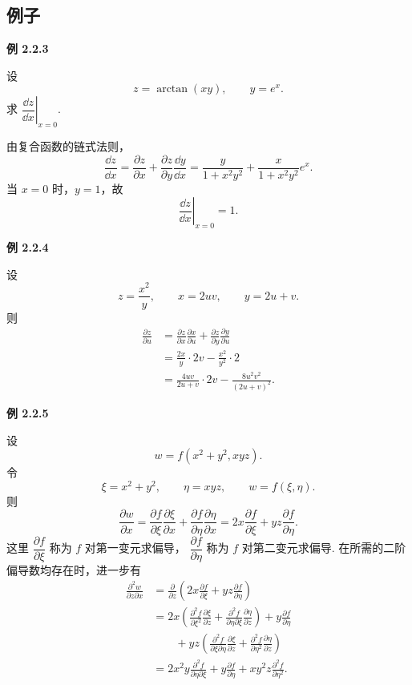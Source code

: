 \subsection*{例子}



\textbf{例 2.2.3}

设
	\[
	z=\arctan(xy),\qquad y=e^x.
	\]
	求 $\left.\dfrac{\dd z}{\dd x}\right|_{x=0}$.

	由复合函数的链式法则，
	\[
	\frac{\dd z}{\dd x}
	=
	\frac{\partial z}{\partial x}
	+
	\frac{\partial z}{\partial y}\frac{\dd y}{\dd x}
	=
	\frac{y}{1+x^2y^2}
	+
	\frac{x}{1+x^2y^2}e^x.
	\]
	当 $x=0$ 时，$y=1$，故
	\[
	\left.\frac{\dd z}{\dd x}\right|_{x=0}=1.
	\]






\textbf{例 2.2.4}

设
	\[
	z=\frac{x^2}{y},\qquad x=2uv,\qquad y=2u+v.
	\]
	则
	\[
	\begin{aligned}
	\frac{\partial z}{\partial u}
	&=
	\frac{\partial z}{\partial x}\frac{\partial x}{\partial u}
	+
	\frac{\partial z}{\partial y}\frac{\partial y}{\partial u}\\
	&=
	\frac{2x}{y}\cdot 2v-\frac{x^2}{y^2}\cdot 2\\
	&=
	\frac{4uv}{2u+v}\cdot 2v
	-
	\frac{8u^2v^2}{(2u+v)^2}.
	\end{aligned}
	\]






\textbf{例 2.2.5}

设
	\[
	w=f(x^2+y^2,xyz).
	\]
	令
	\[
	\xi=x^2+y^2,
	\qquad
	\eta=xyz,
	\qquad
	w=f(\xi,\eta).
	\]
	则
	\[
	\frac{\partial w}{\partial x}
	=
	\frac{\partial f}{\partial\xi}\frac{\partial\xi}{\partial x}
	+
	\frac{\partial f}{\partial\eta}\frac{\partial\eta}{\partial x}
	=
	2x\frac{\partial f}{\partial\xi}
	+yz\frac{\partial f}{\partial\eta}.
	\]
	这里 $\dfrac{\partial f}{\partial\xi}$ 称为 $f$ 对第一变元求偏导，
	$\dfrac{\partial f}{\partial\eta}$ 称为 $f$ 对第二变元求偏导.
	在所需的二阶偏导数均存在时，进一步有
	\[
	\begin{aligned}
	\frac{\partial^2w}{\partial z\partial x}
	&=
	\frac{\partial}{\partial z}
	\left(
	2x\frac{\partial f}{\partial\xi}
	+yz\frac{\partial f}{\partial\eta}
	\right)\\
	&=
	2x\left(
	\frac{\partial^2f}{\partial\xi^2}\frac{\partial\xi}{\partial z}
	+
	\frac{\partial^2f}{\partial\eta\partial\xi}
	\frac{\partial\eta}{\partial z}
	\right)
	+y\frac{\partial f}{\partial\eta}\\
	&\qquad
	+yz\left(
	\frac{\partial^2f}{\partial\xi\partial\eta}
	\frac{\partial\xi}{\partial z}
	+
	\frac{\partial^2f}{\partial\eta^2}
	\frac{\partial\eta}{\partial z}
	\right)\\
	&=
	2x^2y\frac{\partial^2f}{\partial\eta\partial\xi}
	+y\frac{\partial f}{\partial\eta}
	+xy^2z\frac{\partial^2f}{\partial\eta^2}.
	\end{aligned}
	\]




